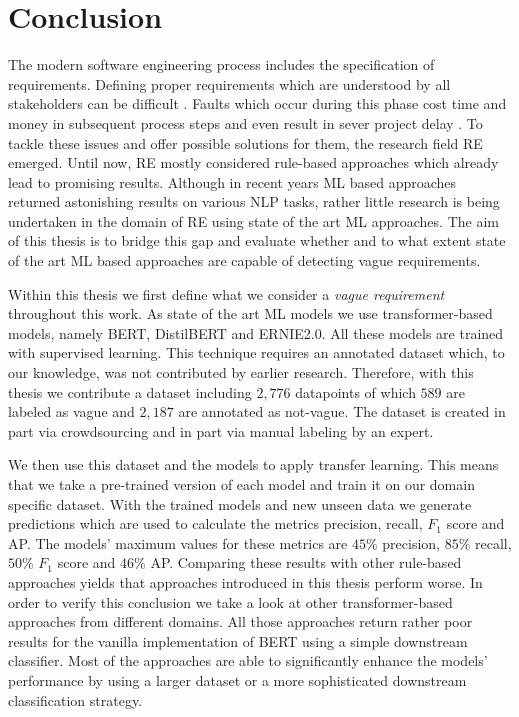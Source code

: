 \chapter{Conclusion}
\label{chp:conclusion}
The modern software engineering process includes the specification of requirements.
Defining proper requirements which are understood by all stakeholders can be difficult \parencite{Lauesen:2001}.
Faults which occur during this phase cost time and money in subsequent process steps \parencite{Mendez:2016} and even result in sever project delay \parencite{Femmer:2014}.
To tackle these issues and offer possible solutions for them, the research field \ac{RE} emerged.
Until now, \ac{RE} mostly considered rule-based approaches which already lead to promising results.
Although in recent years \ac{ML} based approaches returned astonishing results on various \ac{NLP} tasks, rather little research is being undertaken in the domain of \ac{RE} using state of the art \ac{ML} approaches.
The aim of this thesis is to bridge this gap and evaluate whether and to what extent state of the art \ac{ML} based approaches are capable of detecting vague requirements.

Within this thesis we first define what we consider a \textit{vague requirement} throughout this work.
As state of the art \ac{ML} models we use transformer-based models, namely \ac{BERT}, \ac{DistilBERT} and \ac{ERNIE2.0}.
All these models are trained with supervised learning.
This technique requires an annotated dataset which, to our knowledge, was not contributed by earlier research.
Therefore, with this thesis we contribute a dataset including $2,776$ datapoints of which $589$ are labeled as vague and $2,187$ are annotated as not-vague.
The dataset is created in part via crowdsourcing and in part via manual labeling by an expert.

We then use this dataset and the models to apply transfer learning.
This means that we take a pre-trained version of each model and train it on our domain specific dataset.
With the trained models and new unseen data we generate predictions which are used to calculate the metrics precision, recall, $F_1$ score and \ac{AP}.
The models' maximum values for these metrics are $45\%$ precision, $85\%$ recall, $50\%$ $F_1$ score and $46\%$ \ac{AP}.
Comparing these results with other rule-based approaches yields that approaches introduced in this thesis perform worse.
In order to verify this conclusion we take a look at other transformer-based approaches from different domains.
All those approaches return rather poor results for the vanilla implementation of \ac{BERT} using a simple downstream classifier.
Most of the approaches are able to significantly enhance the models' performance by using a larger dataset or a more sophisticated downstream classification strategy.

